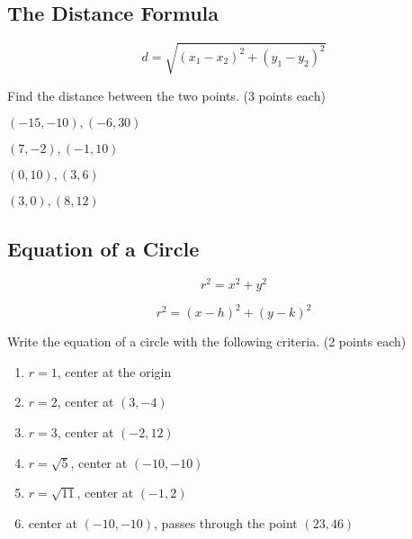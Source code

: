 \documentclass[12pt]{article}
\begin{document}
\hrulefill

\subsection*{The Distance Formula}

$$d=\sqrt{(x_{1}-x_{2})^{2}+(y_{1}-y_{2})^{2}}$$

Find the distance between the two points. (3 points each)\\

\begin{enumerate}[resume]
\begin{multicols}{2}

	\item $(-15,-10),(-6,30)$\\
	
	\item $(7,-2),(-1,10)$\\
	
	\item $(0,10),(3,6)$\\
	
	\item $(3,0), (8,12)$\\

\end{multicols}
\end{enumerate}

\pagebreak

\subsection*{Equation of a Circle}

$$r^2=x^2+y^2$$

$$r^2=(x-h)^2+(y-k)^2$$

Write the equation of a circle with the following criteria. (2 points each)\\

\begin{enumerate}[resume]

	\item $r=1$, center at the origin\\
	
	\item $r=2$, center at $(3,-4)$\\
	
	\item $r=3$, center at $(-2,12)$\\
	
	\item $r=\sqrt{5}$, center at $(-10,-10)$\\
	
	\item $r=\sqrt{11}$, center at $(-1,2)$\\
	
	\item center at $(-10,-10)$, passes through the point $(23,46)$\\
	
	
\end{enumerate}
\end{document}
